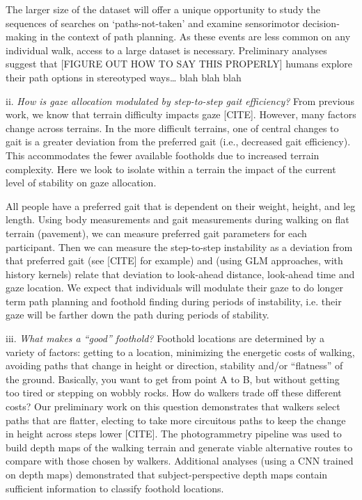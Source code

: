 \documentclass[
]{article}
\begin{document}
The larger size of the dataset will offer a unique opportunity to study
the sequences of searches on `paths-not-taken' and examine sensorimotor
decision-making in the context of path planning. As these events are
less common on any individual walk, access to a large dataset is
necessary. Preliminary analyses suggest that {[}FIGURE OUT HOW TO SAY
THIS PROPERLY{]} humans explore their path options in stereotyped
ways\ldots{} blah blah blah

ii. \emph{How is gaze allocation modulated by step-to-step gait
efficiency?} From previous work, we know that terrain difficulty impacts
gaze {[}CITE{]}. However, many factors change across terrains. In the
more difficult terrains, one of central changes to gait is a greater
deviation from the preferred gait (i.e., decreased gait efficiency).
This accommodates the fewer available footholds due to increased terrain
complexity. Here we look to isolate within a terrain the impact of the
current level of stability on gaze allocation.

All people have a preferred gait that is dependent on their weight,
height, and leg length. Using body measurements and gait measurements
during walking on flat terrain (pavement), we can measure preferred gait
parameters for each participant. Then we can measure the step-to-step
instability as a deviation from that preferred gait (see {[}CITE{]} for
example) and (using GLM approaches, with history kernels) relate that
deviation to look-ahead distance, look-ahead time and gaze location. We
expect that individuals will modulate their gaze to do longer term path
planning and foothold finding during periods of instability, i.e. their
gaze will be farther down the path during periods of stability.

iii. \emph{What makes a ``good'' foothold?} Foothold locations are
determined by a variety of factors: getting to a location, minimizing
the energetic costs of walking, avoiding paths that change in height or
direction, stability and/or ``flatness'' of the ground. Basically, you
want to get from point A to B, but without getting too tired or stepping
on wobbly rocks. How do walkers trade off these different costs? Our
preliminary work on this question demonstrates that walkers select paths
that are flatter, electing to take more circuitous paths to keep the
change in height across steps lower {[}CITE{]}. The photogrammetry
pipeline was used to build depth maps of the walking terrain and
generate viable alternative routes to compare with those chosen by
walkers. Additional analyses (using a CNN trained on depth maps)
demonstrated that subject-perspective depth maps contain sufficient
information to classify foothold locations.
\end{document}
